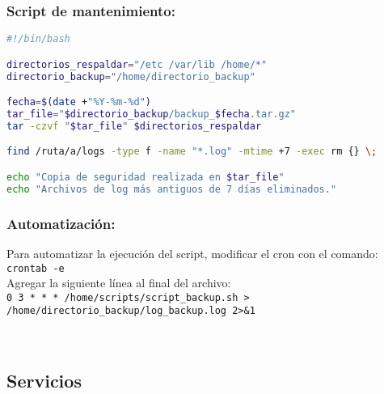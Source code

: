 \documentclass{article}
\begin{document}
\subsubsection{Script de mantenimiento:}
\begin{lstlisting}[language=bash, caption=Script de mantenimiento]
#!/bin/bash

directorios_respaldar="/etc /var/lib /home/*"
directorio_backup="/home/directorio_backup"

fecha=$(date +"%Y-%m-%d")
tar_file="$directorio_backup/backup_$fecha.tar.gz"
tar -czvf "$tar_file" $directorios_respaldar

find /ruta/a/logs -type f -name "*.log" -mtime +7 -exec rm {} \;

echo "Copia de seguridad realizada en $tar_file"
echo "Archivos de log más antiguos de 7 días eliminados."
\end{lstlisting}

\subsubsection{Automatización:}

Para automatizar la ejecución del script, modificar el cron con el comando: \texttt{crontab -e} \\
Agregar la siguiente línea al final del archivo: \\
\texttt{0 3 * * * /home/scripts/script\_backup.sh > /home/directorio\_backup/log\_backup.log 2>&1}

\

\subsection{Servicios}
\end{document}
